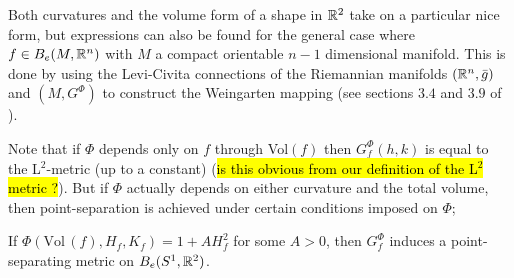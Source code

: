 \begin{remark}
Both curvatures and the volume form of a shape in $\mathbb{R}^2$ take on a particular nice form, but expressions can also be found for the general case where $f \in  B_e(M, \mathbb{R}^n)$ with $M$ a compact orientable $n-1$ dimensional manifold. This is done by using the Levi-Civita connections of the Riemannian manifolds $(\mathbb{R}^n,\bar{g})$ and $(M,G^\Phi)$ to construct the Weingarten mapping (see sections $3.4$ and $3.9$ of \cite{bauer2010almost}).   
\end{remark}
Note that if $\Phi$ depends only on $f$ through Vol$(f)$ then $G_f^\Phi (h,k)$ is equal to the L$^2$-metric (up to a constant) (\hl{is this obvious from our definition of the L$^2$ metric ?}). But if $\Phi$ actually depends on either curvature and the total volume, then point-separation is achieved under certain conditions imposed on $\Phi$;

\begin{theorem}\label{point_sep}
If $\Phi(\text{Vol} \, (f), H_f, K_f) = 1 + A H_f^2$ for some $A > 0$, then $G_f^\Phi$ induces a point-separating metric on $B_e(S^1, \mathbb{R}^2)$.
\end{theorem}

